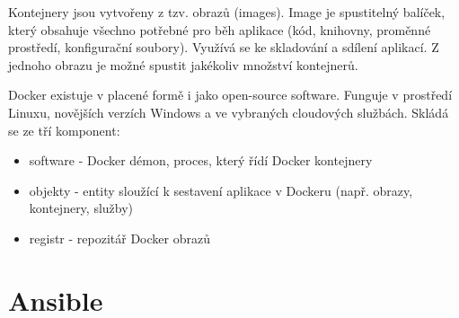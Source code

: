Kontejnery jsou vytvořeny z tzv. obrazů (images). Image je spustitelný balíček, který obsahuje všechno potřebné pro běh aplikace (kód, knihovny, proměnné prostředí, konfigurační soubory). Využívá se ke skladování a sdílení aplikací. Z jednoho obrazu je možné spustit jakékoliv množství kontejnerů. 

Docker existuje v placené formě i jako open-source software. Funguje v prostředí Linuxu, novějších verzích Windows a ve vybraných cloudových službách. Skládá se ze tří komponent:

\begin{itemize}
\item software - Docker démon, proces, který řídí Docker kontejnery
\item objekty - entity sloužící k sestavení aplikace v Dockeru (např. obrazy, kontejnery, služby)
\item registr - repozitář Docker obrazů
\end{itemize}

\section{Ansible}
\label{ansible}  

